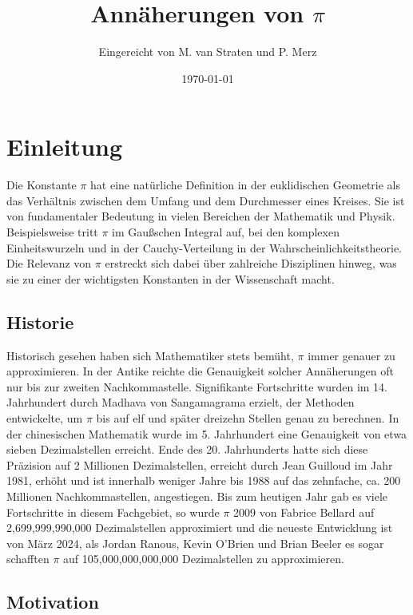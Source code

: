 \documentclass{scrartcl}
\title{Annäherungen von \(\pi\)}
\author{
  Eingereicht von M. van Straten und P. Merz
}
\date{\today} %
\theoremstyle{definition}
\newtheorem{approximation sequence}{Annäherungsfolge}
\begin{document}
\maketitle
\cleardoublepage{}
\tableofcontents
\cleardoublepage{}

\section{Einleitung}

Die Konstante \(\pi\) hat eine natürliche Definition in der euklidischen
Geometrie als das Verhältnis zwischen dem Umfang und dem Durchmesser eines
Kreises. Sie ist von fundamentaler Bedeutung in vielen Bereichen der Mathematik
und Physik. Beispielsweise tritt \(\pi\) im Gaußschen Integral auf, bei den
komplexen Einheitswurzeln und in der Cauchy-Verteilung in der
Wahrscheinlichkeitstheorie. Die Relevanz von \(\pi\) erstreckt sich dabei über
zahlreiche Disziplinen hinweg, was sie zu einer der wichtigsten Konstanten in
der Wissenschaft macht.

\subsection{Historie}

Historisch gesehen haben sich Mathematiker stets bemüht, \(\pi\) immer genauer
zu approximieren. In der Antike reichte die Genauigkeit solcher Annäherungen
oft nur bis zur zweiten Nachkommastelle. Signifikante Fortschritte wurden im
14. Jahrhundert durch Madhava von Sangamagrama erzielt, der Methoden
entwickelte, um \(\pi\) bis auf elf und später dreizehn Stellen genau zu
berechnen. In der chinesischen Mathematik wurde im 5. Jahrhundert eine
Genauigkeit von etwa sieben Dezimalstellen erreicht. Ende des 20. Jahrhunderts
hatte sich diese Präzision auf 2 Millionen Dezimalstellen, erreicht durch Jean
Guilloud im Jahr 1981, erhöht und ist innerhalb weniger Jahre bis 1988 auf das
zehnfache, ca. 200 Millionen Nachkommastellen, angestiegen. Bis zum heutigen
Jahr gab es viele Fortschritte in diesem Fachgebiet, so wurde \(\pi\) 2009 von
Fabrice Bellard auf 2,699,999,990,000 Dezimalstellen approximiert und die
neueste Entwicklung ist von März 2024, als Jordan Ranous, Kevin O’Brien und
Brian Beeler es sogar schafften \(\pi\) auf 105,000,000,000,000 Dezimalstellen
zu approximieren. \cite{Chronology}

\subsection{Motivation}
\end{document}
